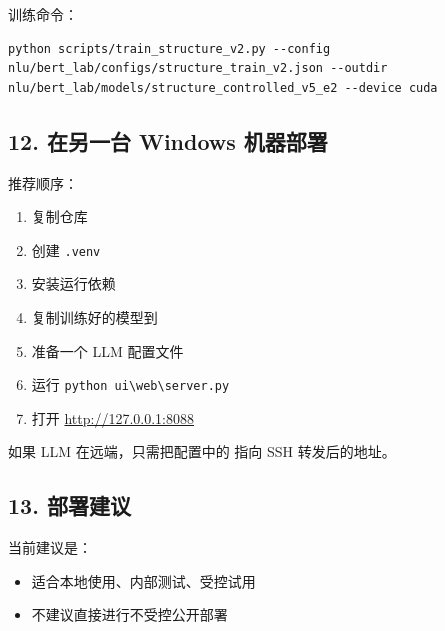 \documentclass[11pt,a4paper]{ctexart}
\begin{document}
训练命令：

\begin{verbatim}
python scripts/train_structure_v2.py --config nlu/bert_lab/configs/structure_train_v2.json --outdir nlu/bert_lab/models/structure_controlled_v5_e2 --device cuda
\end{verbatim}

\subsection*{12. 在另一台 Windows 机器部署}

推荐顺序：

\begin{enumerate}
\item 复制仓库
\item 创建 \texttt{.venv}
\item 安装运行依赖
\item 复制训练好的模型到 
\item 准备一个 LLM 配置文件
\item 运行 \texttt{python ui\textbackslash web\textbackslash server.py}
\item 打开 \url{http://127.0.0.1:8088}
\end{enumerate}

如果 LLM 在远端，只需把配置中的  指向 SSH 转发后的地址。

\subsection*{13. 部署建议}

当前建议是：

\begin{itemize}
\item 适合本地使用、内部测试、受控试用
\item 不建议直接进行不受控公开部署
\end{itemize}
\end{document}
